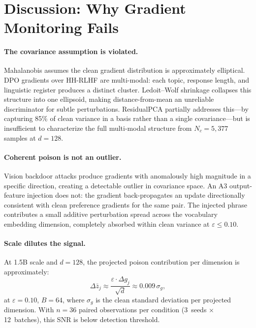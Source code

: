 \documentclass[runningheads]{llncs}
\begin{document}
\section{Discussion: Why Gradient Monitoring Fails}\label{sec:discussion}

\paragraph{The covariance assumption is violated.}
Mahalanobis assumes the clean gradient distribution is approximately elliptical.
DPO gradients over HH-RLHF are multi-modal: each topic, response length, and
linguistic register produces a distinct cluster. Ledoit--Wolf shrinkage
collapses this structure into one ellipsoid, making distance-from-mean an
unreliable discriminator for subtle perturbations. ResidualPCA partially
addresses this---by capturing 85\% of clean variance in a basis rather than a
single covariance---but is insufficient to characterize the full multi-modal
structure from $N_c = 5{,}377$ samples at $d = 128$.

\paragraph{Coherent poison is not an outlier.}
Vision backdoor attacks produce gradients with anomalously high magnitude in a
specific direction, creating a detectable outlier in covariance space. An A3
output-feature injection does not: the gradient back-propagates an update
directionally consistent with clean preference gradients for the same pair.
The injected phrase contributes a small additive perturbation spread across the
vocabulary embedding dimension, completely absorbed within clean variance at
$\varepsilon \leq 0.10$.

\paragraph{Scale dilutes the signal.}
At 1.5B scale and $d = 128$, the projected poison contribution per dimension
is approximately:
\begin{equation}
  \Delta\bar{z}_j \approx \frac{\varepsilon \cdot \Delta g_j}{\sqrt{d}}
  \approx 0.009\,\sigma_g,
\end{equation}
at $\varepsilon = 0.10$, $B = 64$, where $\sigma_g$ is the clean standard
deviation per projected dimension. With $n = 36$ paired observations per
condition (3~seeds $\times$ 12~batches), this SNR is below detection threshold.
\end{document}
